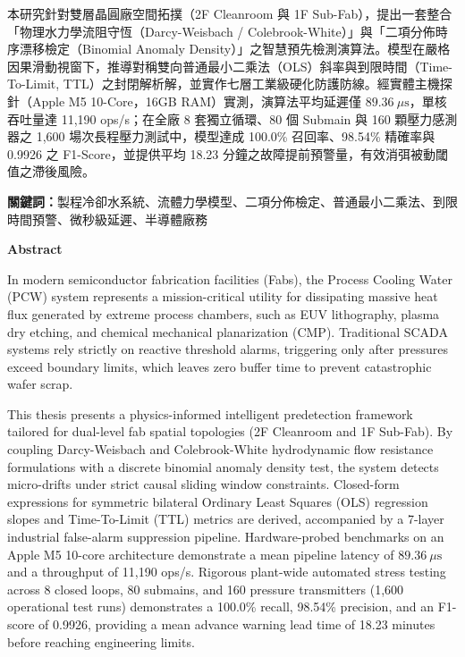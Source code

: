 \documentclass[fontset=none, a4paper, 12pt]{ctexart}
\begin{document}
本研究針對雙層晶圓廠空間拓撲（2F Cleanroom 與 1F Sub-Fab），提出一套整合「物理水力學流阻守恆（Darcy-Weisbach / Colebrook-White）」與「二項分佈時序漂移檢定（Binomial Anomaly Density）」之智慧預先檢測演算法。模型在嚴格因果滑動視窗下，推導對稱雙向普通最小二乘法（OLS）斜率與到限時間（Time-To-Limit, TTL）之封閉解析解，並實作七層工業級硬化防護防線。經實體主機探針（Apple M5 10-Core，16GB RAM）實測，演算法平均延遲僅 $89.36\ \mu\mathrm{s}$，單核吞吐量達 11,190 ops/s；在全廠 8 套獨立循環、80 個 Submain 與 160 顆壓力感測器之 1,600 場次長程壓力測試中，模型達成 100.0\% 召回率、98.54\% 精確率與 0.9926 之 F1-Score，並提供平均 18.23 分鐘之故障提前預警量，有效消弭被動閾值之滯後風險。

\vspace{1em}
\noindent \textbf{關鍵詞：}製程冷卻水系統、流體力學模型、二項分佈檢定、普通最小二乘法、到限時間預警、微秒級延遲、半導體廠務

\newpage

{}
\begin{center}
\large\bfseries Abstract
\end{center}
\vspace{0.5em}

In modern semiconductor fabrication facilities (Fabs), the Process Cooling Water (PCW) system represents a mission-critical utility for dissipating massive heat flux generated by extreme process chambers, such as EUV lithography, plasma dry etching, and chemical mechanical planarization (CMP). Traditional SCADA systems rely strictly on reactive threshold alarms, triggering only after pressures exceed boundary limits, which leaves zero buffer time to prevent catastrophic wafer scrap.

This thesis presents a physics-informed intelligent predetection framework tailored for dual-level fab spatial topologies (2F Cleanroom and 1F Sub-Fab). By coupling Darcy-Weisbach and Colebrook-White hydrodynamic flow resistance formulations with a discrete binomial anomaly density test, the system detects micro-drifts under strict causal sliding window constraints. Closed-form expressions for symmetric bilateral Ordinary Least Squares (OLS) regression slopes and Time-To-Limit (TTL) metrics are derived, accompanied by a 7-layer industrial false-alarm suppression pipeline. Hardware-probed benchmarks on an Apple M5 10-core architecture demonstrate a mean pipeline latency of $89.36\ \mu\mathrm{s}$ and a throughput of 11,190 ops/s. Rigorous plant-wide automated stress testing across 8 closed loops, 80 submains, and 160 pressure transmitters (1,600 operational test runs) demonstrates a 100.0\% recall, 98.54\% precision, and an F1-score of 0.9926, providing a mean advance warning lead time of 18.23 minutes before reaching engineering limits.
\end{document}
